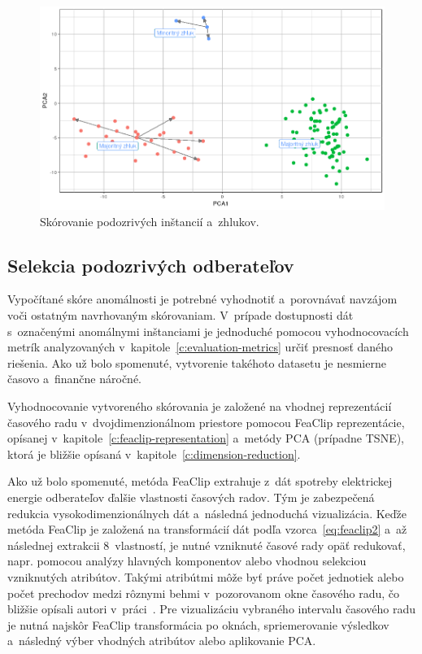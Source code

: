 \documentclass[a4paper,twoside,slovak,12pt,appendix]{article}
\begin{document}
\begin{figure}[htbp]
  \centering
  \includegraphics[width=\textwidth]{clustering_score.png}
  \caption{Skórovanie podozrivých inštancií a~zhlukov.}
  \label{fig:clustering-score}
\end{figure}

\subsection{Selekcia podozrivých odberateľov}
Vypočítané skóre anomálnosti je potrebné vyhodnotiť a~porovnávať navzájom voči
ostatným navrhovaným skórovaniam. V~prípade dostupnosti dát s~označenými
anomálnymi inštanciami je jednoduché pomocou vyhodnocovacích metrík
analyzovaných v~kapitole~\ref{c:evaluation-metrics} určiť presnosť daného
riešenia. Ako už bolo spomenuté, vytvorenie takéhoto datasetu je nesmierne
časovo a~finančne náročné.

Vyhodnocovanie vytvoreného skórovania je založené na vhodnej reprezentácií
časového radu v~dvojdimenzionálnom priestore pomocou FeaClip reprezentácie,
opísanej v~kapitole~\ref{c:feaclip-representation} a~metódy PCA (prípadne TSNE),
ktorá je bližšie opísaná v~kapitole~\ref{c:dimension-reduction}.

Ako už bolo spomenuté, metóda FeaClip extrahuje z~dát spotreby elektrickej
energie odberateľov ďalšie vlastnosti časových radov. Tým je zabezpečená
redukcia vysokodimenzionálnych dát a~následná jednoduchá vizualizácia. Keďže
metóda FeaClip je založená na transformácií dát podľa vzorca~\ref{eq:feaclip2}
a~až následnej extrakcii 8~vlastností, je nutné vzniknuté časové rady opäť
redukovať, napr. pomocou analýzy hlavných komponentov alebo vhodnou selekciou
vzniknutých atribútov. Takými atribútmi môže byť práve počet jednotiek alebo
počet prechodov medzi rôznymi behmi v~pozorovanom okne časového radu, čo bližšie
opísali autori v~práci~\cite{Laurinec2018}. Pre vizualizáciu vybraného intervalu
časového radu je nutná najskôr FeaClip transformácia po oknách, spriemerovanie
výsledkov a~následný výber vhodných atribútov alebo aplikovanie PCA.
\end{document}
